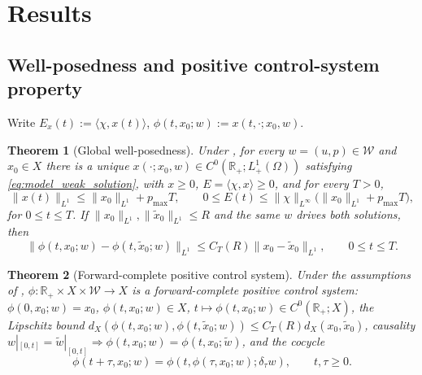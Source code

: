 \documentclass[a4paper,fleqn,longmktitle]{cas-sc}
\theoremstyle{plain}
\newtheorem{theorem}{Theorem}[section]
\theoremstyle{definition}
\theoremstyle{remark}
\numberwithin{equation}{section}
\begin{document}
\section{Results}
\label{sec:main_results}
\subsection{Well-posedness and positive control-system property}
\label{subsec:main_wellposedness}
Write \(E_x(t):=\langle\chi,x(t)\rangle\), \(\phi(t,x_0;w):=x(t,\cdot;x_0,w)\).
\begin{theorem}[Global well-posedness]
\label{thm:main_global_wellposedness}
Under , for every
\(w=(u,p)\in\mathcal W\) and \(x_0\in X\) there is a unique
\(x(\cdot;x_0,w)\in C^0(\mathbb R_+;L^1_+(\Omega))\) satisfying
\eqref{eq:model_weak_solution}, with \(x\ge0\),
\(E=\langle\chi,x\rangle\ge0\), and for every \(T>0\),
\[
    \|x(t)\|_{L^1}
    \le
    \|x_0\|_{L^1}+p_{\max}T,
    \qquad
    0\le E(t)
    \le
    \|\chi\|_{L^\infty}\big(\|x_0\|_{L^1}+p_{\max}T\big),
\]
for \(0\le t\le T\). If \(\|x_0\|_{L^1},\|\widetilde x_0\|_{L^1}\le R\) and the
same \(w\) drives both solutions, then
\begin{equation}
    \label{eq:main_continuous_dependence}
    \|\phi(t,x_0;w)-\phi(t,\widetilde x_0;w)\|_{L^1}
    \le
    C_T(R)\|x_0-\widetilde x_0\|_{L^1},
    \qquad
    0\le t\le T .
\end{equation}
\end{theorem}
\begin{theorem}[Forward-complete positive control system]
\label{thm:main_positive_control_system}
Under the assumptions of ,
\(\phi:\mathbb R_+\times X\times\mathcal W\to X\) is a forward-complete
positive control system: \(\phi(0,x_0;w)=x_0\), \(\phi(t,x_0;w)\in X\),
\(t\mapsto\phi(t,x_0;w)\in C^0(\mathbb R_+;X)\), the Lipschitz bound
\(d_X(\phi(t,x_0;w),\phi(t,\widetilde x_0;w))\le C_T(R)d_X(x_0,\widetilde x_0)\),
causality \(w|_{[0,t]}=\widetilde w|_{[0,t]}\Rightarrow
\phi(t,x_0;w)=\phi(t,x_0;\widetilde w)\), and the cocycle
\begin{equation}
    \label{eq:main_cocycle}
    \phi(t+\tau,x_0;w)
    =
    \phi\!\left(t,\phi(\tau,x_0;w);\delta_\tau w\right),
    \qquad
    t,\tau\ge0 .
\end{equation}
\end{theorem}
\end{document}

